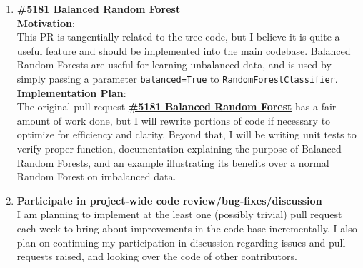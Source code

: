 \documentclass[12pt, oneside]{article}
\begin{document}
\begin{enumerate}
  \item
  \textbf{\href{https://github.com/scikit-learn/scikit-learn/pull/5181}
    {\#5181 Balanced Random Forest}}\\
  \textbf{Motivation}:\\
  This PR is tangentially related to the tree code, but I believe it
  is quite a useful feature and should be implemented into the main
  codebase. Balanced Random Forests are useful for learning unbalanced
  data, and is used by simply passing a parameter
  \texttt{balanced=True} to \texttt{RandomForestClassifier}.\\
  \textbf{Implementation Plan}:\\
  The original pull request
  \textbf{\href{https://github.com/scikit-learn/scikit-learn/pull/5181}
    {\#5181 Balanced Random Forest}} has a fair amount of work done,
  but I will rewrite portions of code if necessary to optimize for
  efficiency and clarity. Beyond that, I will be writing unit tests to
  verify proper function, documentation explaining the purpose of
  Balanced Random Forests, and an example illustrating its benefits
  over a normal Random Forest on imbalanced data.

  \item \textbf{Participate in project-wide code
    review/bug-fixes/discussion}\\
  I am planning to implement at the least one (possibly trivial) pull
  request each week to bring about improvements in the code-base
  incrementally. I also plan on continuing my participation in
  discussion regarding issues and pull requests raised, and looking
  over the code of other contributors.

\end{enumerate}
\end{document}
